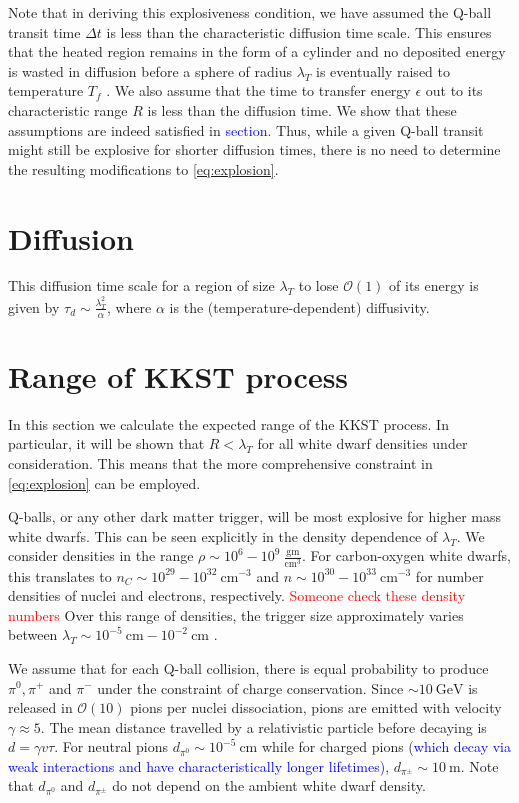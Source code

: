 \documentclass[11 pt, preprint,preprintnumbers,amsmath,amssymb, prd]{revtex4}
\newcommand{\OO}{\mathcal{O}}
\begin{document}
Note that in deriving this explosiveness condition, we have assumed the Q-ball transit time $\Delta t$ is less than the characteristic diffusion time scale. This ensures that the heated region remains in the form of a cylinder and no deposited energy is wasted in diffusion before a sphere of radius $\lambda_T$ is eventually raised to temperature $T_f$ . We also assume that the time to transfer energy $\epsilon$ out to its characteristic range $R$ is less than the diffusion time. We show that these assumptions are indeed satisfied in \textcolor{blue}{section}. Thus, while a given Q-ball transit might still be explosive for shorter diffusion times, there is no need to determine the resulting modifications to \eqref{eq:explosion}. 

\section{Diffusion}
This diffusion time scale for a region of size $\lambda_T$ to lose $\OO(1)$ of its energy is given by $\tau_d \sim \frac{\lambda_T^2}{\alpha}$, where $\alpha$ is the (temperature-dependent) diffusivity. 

\section{Range of KKST process}

In this section we calculate the expected range of the KKST process. In particular, it will be shown that $R < \lambda_T$ for all white dwarf densities under consideration. This means that the more comprehensive constraint in \eqref{eq:explosion} can be employed. 

Q-balls, or any other dark matter trigger, will be most explosive for higher mass white dwarfs. This can be seen explicitly in the density dependence of $\lambda_T$. We consider densities in the range $\rho \sim 10^{6} - 10^{9} ~\frac{\text{gm}}{\text{cm}^3}$. For carbon-oxygen white dwarfs, this translates to $n_C \sim 10^{29} - 10^{32} ~\text{cm}^{-3}$ and $n \sim 10^{30} - 10^{33} ~\text{cm}^{-3}$ for number densities of nuclei and electrons, respectively. \textcolor{red}{Someone check these density numbers} Over this range of densities, the trigger size approximately varies between $\lambda_T \sim 10^{-5} ~\text{cm} -10^{-2} ~\text{cm}$ \cite{Varela}. 

We assume that for each Q-ball collision, there is equal probability to produce $\pi^0, \pi^+$ and $\pi^-$ under the constraint of charge conservation. Since $\sim 10 ~\text{GeV}$ is released in $\OO(10)$ pions per nuclei dissociation, pions are emitted with velocity $\gamma \approx 5$. The mean distance travelled by a relativistic particle before decaying is $d = \gamma v \tau$. For neutral pions $d_{\pi^0} \sim 10^{-5} ~\text{cm}$ while for charged pions (\textcolor{blue}{which decay via weak interactions and have characteristically longer lifetimes)}, $d_{\pi^\pm} \sim 10 ~\text{m}$. Note that $d_{\pi^0}$ and $d_{\pi^\pm}$ do not depend on the ambient white dwarf density. 
\end{document}
